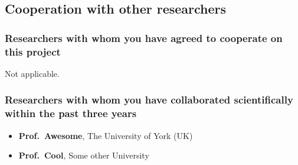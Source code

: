 \subsection{Cooperation with other researchers}

\subsubsection{Researchers with whom you have agreed to cooperate on this project}
Not applicable.

\subsubsection{Researchers with whom you have collaborated scientifically within the past three years}

\small

\begin{itemize}\setlength{\itemsep}{0pt}
\item {\bfseries Prof.\ Awesome}, The University of York (UK) 
\item {\bfseries Prof.\ Cool}, Some other University
\end{itemize}
